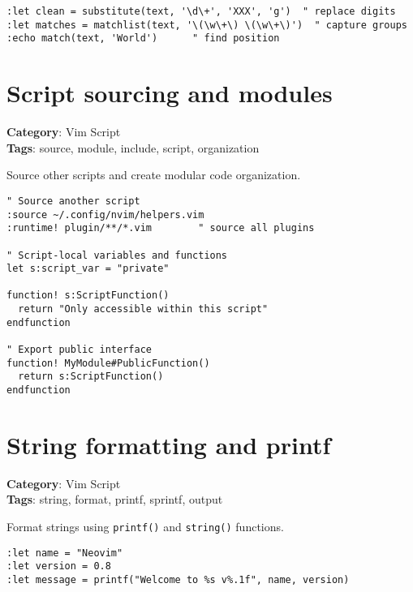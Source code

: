{{{{{{{{{{{{{{{{{{{\begin{Exa*}{}
\begin{Verbatim}[fontsize=\footnotesize, breaklines, breakanywhere]
:let clean = substitute(text, '\d\+', 'XXX', 'g')  " replace digits
:let matches = matchlist(text, '\(\w\+\) \(\w\+\)')  " capture groups
:echo match(text, 'World')      " find position
\end{Verbatim}
\end{Exa*}

\section{Script sourcing and modules}

\textbf{Category}: Vim Script\\ \textbf{Tags}: source, module, include, script, organization
\vspace{0.5cm}

Source other scripts and create modular code organization.

\begin{Exa*}{}
\begin{Verbatim}[fontsize=\footnotesize, breaklines, breakanywhere]
" Source another script
:source ~/.config/nvim/helpers.vim
:runtime! plugin/**/*.vim        " source all plugins

" Script-local variables and functions
let s:script_var = "private"

function! s:ScriptFunction()
  return "Only accessible within this script"
endfunction

" Export public interface
function! MyModule#PublicFunction()
  return s:ScriptFunction()
endfunction
\end{Verbatim}
\end{Exa*}

\section{String formatting and printf}

\textbf{Category}: Vim Script\\ \textbf{Tags}: string, format, printf, sprintf, output
\vspace{0.5cm}

Format strings using {\footnotesize \Verb§printf()§} and {\footnotesize \Verb§string()§} functions.

\begin{Exa*}{}
\begin{Verbatim}[fontsize=\footnotesize, breaklines, breakanywhere]
:let name = "Neovim"
:let version = 0.8
:let message = printf("Welcome to %s v%.1f", name, version)


\end{Verbatim}
\end{Exa*}}}}}}}}}}}}}}}}}}}}
